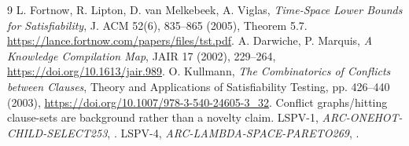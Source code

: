 \documentclass[11pt]{article}
\begin{document}
\begin{thebibliography}{9}
 L. Fortnow, R. Lipton, D. van Melkebeek, A. Viglas, \emph{Time-Space Lower Bounds for Satisfiability}, J. ACM 52(6), 835--865 (2005), Theorem 5.7. \url{https://lance.fortnow.com/papers/files/tst.pdf}.
 A. Darwiche, P. Marquis, \emph{A Knowledge Compilation Map}, JAIR 17 (2002), 229--264, \url{https://doi.org/10.1613/jair.989}.
 O. Kullmann, \emph{The Combinatorics of Conflicts between Clauses}, Theory and Applications of Satisfiability Testing, pp. 426--440 (2003), \url{https://doi.org/10.1007/978-3-540-24605-3_32}. Conflict graphs/hitting clause-sets are background rather than a novelty claim.
 LSPV-1, \emph{ARC-ONEHOT-CHILD-SELECT253}, .
 LSPV-4, \emph{ARC-LAMBDA-SPACE-PARETO269}, .
\end{thebibliography}
\end{document}

